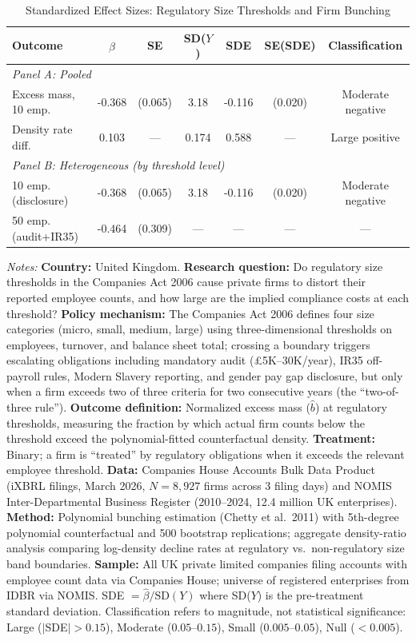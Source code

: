\begin{table}[htbp]
\centering
\caption{Standardized Effect Sizes: Regulatory Size Thresholds and Firm Bunching}
\label{tab:sde}
\begin{threeparttable}
\begin{tabular}{lcccccc}
\toprule
Outcome & $\hat{\beta}$ & SE & SD($Y$) & SDE & SE(SDE) & Classification \\
\midrule
\multicolumn{7}{l}{\textit{Panel A: Pooled}} \\
\midrule
Excess mass, 10 emp. & -0.368 & (0.065) & 3.18 & -0.116 & (0.020) & Moderate negative \\
Density rate diff. & 0.103 & --- & 0.174 & 0.588 & --- & Large positive \\
\midrule
\multicolumn{7}{l}{\textit{Panel B: Heterogeneous (by threshold level)}} \\
\midrule
10 emp. (disclosure) & -0.368 & (0.065) & 3.18 & -0.116 & (0.020) & Moderate negative \\
50 emp. (audit+IR35) & -0.464 & (0.309) & --- & --- & --- & --- \\
\bottomrule
\end{tabular}
\begin{tablenotes}[flushleft]
\small
\item \textit{Notes:} \textbf{Country:} United Kingdom. \textbf{Research question:} Do regulatory size thresholds in the Companies Act 2006 cause private firms to distort their reported employee counts, and how large are the implied compliance costs at each threshold? \textbf{Policy mechanism:} The Companies Act 2006 defines four size categories (micro, small, medium, large) using three-dimensional thresholds on employees, turnover, and balance sheet total; crossing a boundary triggers escalating obligations including mandatory audit (\pounds5K--30K/year), IR35 off-payroll rules, Modern Slavery reporting, and gender pay gap disclosure, but only when a firm exceeds two of three criteria for two consecutive years (the ``two-of-three rule''). \textbf{Outcome definition:} Normalized excess mass ($\hat{b}$) at regulatory thresholds, measuring the fraction by which actual firm counts below the threshold exceed the polynomial-fitted counterfactual density. \textbf{Treatment:} Binary; a firm is ``treated'' by regulatory obligations when it exceeds the relevant employee threshold. \textbf{Data:} Companies House Accounts Bulk Data Product (iXBRL filings, March 2026, $N = 8{,}927$ firms across 3 filing days) and NOMIS Inter-Departmental Business Register (2010--2024, 12.4 million UK enterprises). \textbf{Method:} Polynomial bunching estimation (Chetty et al.\ 2011) with 5th-degree polynomial counterfactual and 500 bootstrap replications; aggregate density-ratio analysis comparing log-density decline rates at regulatory vs.\ non-regulatory size band boundaries. \textbf{Sample:} All UK private limited companies filing accounts with employee count data via Companies House; universe of registered enterprises from IDBR via NOMIS. SDE $= \hat{\beta} / \text{SD}(Y)$ where SD($Y$) is the pre-treatment standard deviation. Classification refers to magnitude, not statistical significance: Large ($|$SDE$| > 0.15$), Moderate ($0.05$--$0.15$), Small ($0.005$--$0.05$), Null ($< 0.005$).

\end{tablenotes}
\end{threeparttable}
\end{table}
